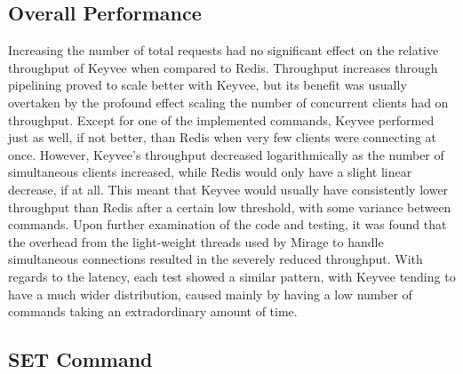\documentclass[english,10pt,twocolumn]{article}
\begin{document}
\subsection{Overall Performance}

Increasing the number of total requests had no significant effect on the relative throughput of Keyvee when compared to Redis.
Throughput increases through pipelining proved to scale better with Keyvee, but its benefit was usually overtaken by the profound effect scaling the number of concurrent clients had on throughput.
Except for one of the implemented commands, Keyvee performed just as well, if not better, than Redis when very few clients were connecting at once.
However, Keyvee's throughput decreased logarithmically as the number of simultaneous clients increased, while Redis would only have a slight linear decrease, if at all.
This meant that Keyvee would usually have consistently lower throughput than Redis after a certain low threshold, with some variance between commands.
Upon further examination of the code and testing, it was found that the overhead from the light-weight threads used by Mirage to handle simultaneous connections resulted in the severely reduced throughput.
With regards to the latency, each test showed a similar pattern, with Keyvee tending to have a much wider distribution, caused mainly by having a low number of commands taking an extradordinary amount of time.

\subsection{SET Command}
\end{document}
